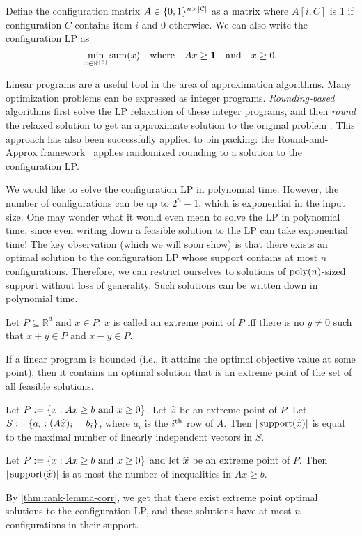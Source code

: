 Define the configuration matrix $A \in \{0, 1\}^{n \times |\mathcal{C}|}$
as a matrix where $A[i, C]$ is 1 if configuration $C$ contains item $i$ and 0 otherwise.
We can also write the configuration LP as
\[ \min_{x \in \mathbb{R}^{|\mathcal{C}|}} \operatorname{sum}(x)
\quad\textrm{where}\quad Ax \ge \mathbf{1} \quad\textrm{and}\quad x \ge 0. \]

Linear programs are a useful tool in the area of approximation algorithms.
Many optimization problems can be expressed as integer programs.
\emph{Rounding-based} algorithms first solve the LP relaxation of these integer programs,
and then \emph{round} the relaxed solution to get an approximate solution to the original problem
\cite{daa:det-lp-round,daa:rand-lp-round,iterative-methods}.
This approach has also been successfully applied to bin packing:
the Round-and-Approx framework~\cite{rna,bansal2014binpacking}
applies randomized rounding to a solution to the configuration LP.

We would like to solve the configuration LP in polynomial time.
However, the number of configurations can be up to $2^n-1$,
which is exponential in the input size.
One may wonder what it would even mean to solve the LP in polynomial time,
since even writing down a feasible solution to the LP can take exponential time!
The key observation (which we will soon show) is that
there exists an optimal solution to the configuration LP
whose support contains at most $n$ configurations.
Therefore, we can restrict ourselves to solutions of $\operatorname{poly}(n)$-sized support
without loss of generality. Such solutions can be written down in polynomial time.

\begin{definition}
Let $P \subseteq \mathbb{R}^d$ and $x \in P$.
$x$ is called an extreme point of $P$ iff there is no $y \neq 0$
such that $x + y \in P$ and $x - y \in P$.
\end{definition}
\begin{lemma}
If a linear program is bounded (i.e., it attains the optimal objective value at some point),
then it contains an optimal solution that is an extreme point of the set of all feasible solutions.
\end{lemma}
\begin{lemma}
Let $P := \{x: Ax \ge b \textrm{ and } x \ge 0\}$. Let $\widehat{x}$ be an extreme point of $P$.
Let $S := \{a_i: (A\widehat{x})_i = b_i\}$, where $a_i$ is the $i^{\textrm{th}}$ row of $A$.
Then $|\operatorname{support}(\widehat{x})|$ is equal to the maximal number of linearly independent vectors in $S$.
\end{lemma}
\begin{corollary}
\label{thm:rank-lemma-corr}
Let $P := \{x: Ax \ge b \textrm{ and } x \ge 0\}$ and let $\widehat{x}$ be an extreme point of $P$.
Then $|\operatorname{support}(\widehat{x})|$ is at most the number of inequalities in $Ax \ge b$.
\end{corollary}
By \cref{thm:rank-lemma-corr}, we get that there exist extreme point optimal solutions
to the configuration LP, and these solutions have at most $n$ configurations in their support.


